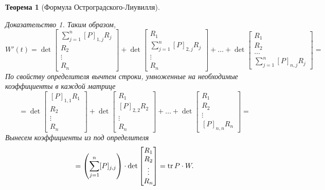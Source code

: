 \documentclass[a5paper, 10pt]{article}
\theoremstyle{definition}
\theoremstyle{plain}
\newtheorem{Th}{Теорема}
\theoremstyle{remark}
\newtheorem*{Proof}{Доказательство}
\begin{document}
\begin{Th}[Формула Остроградского-Лиувилля]
\begin{Proof}
			Таким образом, 
			\[
			W'(t) = \det \begin{bmatrix}
				\sum\limits_{j=1}^n [P]_{1,j} R_j\\R_2\\\vdots\\R_n
			\end{bmatrix} + \det\begin{bmatrix}
			R_1 \\ \sum\limits_{j=1}^n [P]_{2,j} R_j\\\vdots\\R_n
		\end{bmatrix} + 
	\dots + \det\begin{bmatrix}
		R_1 \\ R_2 \\ \dots \\ \sum\limits_{j=1}^n [P]_{n,j} R_j
	\end{bmatrix} = 
		\]
			По свойству определителя вычтем строки, умноженные на необходимые коэффициенты в каждой матрице  \\
			  \[
			=\det \begin{bmatrix}
				[P]_{1,1}R_1\\R_2\\\vdots\\R_n
			\end{bmatrix}
			+ 
			\det \begin{bmatrix}
				R_1\\ [P]_{2,2} R_2\\\vdots\\R_n
			\end{bmatrix}
			+ 
			\dots +
			\det \begin{bmatrix}
				R_1\\R_2\\\vdots\\ [P]_{n,n}R_n
			\end{bmatrix} =
		\]
		Вынесем коэффициенты из под определителя
		\[
		= \left(\sum\limits_{j=1}^n [P]_{j,j}\right) \cdot \det \begin{bmatrix}
			R_1\\R_2\\\vdots\\R_n
		\end{bmatrix}=\operatorname{tr} P \cdot W.
			\]
		\end{Proof}
	\end{Th}
\end{document}
